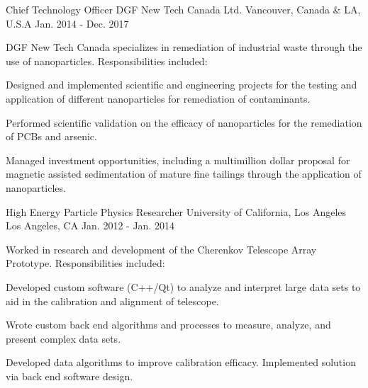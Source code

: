 \begin{cventries}

\cventry
{Chief Technology Officer} %
{DGF New Tech Canada Ltd.} %
{Vancouver, Canada \& LA, U.S.A} %
{Jan. 2014 - Dec. 2017} %
{%
\begin{cvitems}
\item[] {DGF New Tech Canada specializes in remediation of industrial waste through the use of nanoparticles. Responsibilities included:} %
\item {Designed and implemented scientific and engineering projects for the testing and application of different nanoparticles for remediation of contaminants.}
\item {Performed scientific validation on the efficacy of nanoparticles for the remediation of PCBs and arsenic.}
\item {Managed investment opportunities, including a multimillion dollar proposal for magnetic assisted sedimentation of mature fine tailings through the application of nanoparticles.}
\end{cvitems}
}


\cventry
{High Energy Particle Physics Researcher} %
{University of California, Los Angeles} %
{Los Angeles, CA} %
{Jan. 2012 - Jan. 2014} %
{%
\begin{cvitems}
\item[] {Worked in research and development of the Cherenkov Telescope Array Prototype. Responsibilities included:} %
\item {Developed custom software (C++/Qt) to analyze and interpret large data sets to aid in the calibration and alignment of telescope.}
\item {Wrote custom back end algorithms and processes to measure, analyze, and present complex data sets.}
\item {Developed data algorithms to improve calibration efficacy. Implemented solution via back end software design.}
\end{cvitems}
}


\end{cventries}
